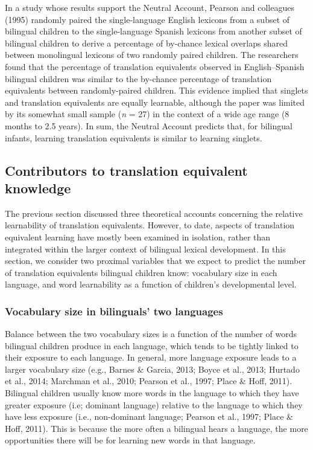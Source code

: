 \documentclass[
  english,
  ,man,floatsintext]{apa6}
\begin{document}
In a study whose results support the Neutral Account, Pearson and colleagues (1995) randomly paired the single-language English lexicons from a subset of bilingual children to the single-language Spanish lexicons from another subset of bilingual children to derive a percentage of by-chance lexical overlaps shared between monolingual lexicons of two randomly paired children. The researchers found that the percentage of translation equivalents observed in English--Spanish bilingual children was similar to the by-chance percentage of translation equivalents between randomly-paired children. This evidence implied that singlets and translation equivalents are equally learnable, although the paper was limited by its somewhat small sample (\emph{n} = 27) in the context of a wide age range (8 months to 2.5 years). In sum, the Neutral Account predicts that, for bilingual infants, learning translation equivalents is similar to learning singlets.

\hypertarget{contributors-to-translation-equivalent-knowledge}{%
\subsection{Contributors to translation equivalent knowledge}\label{contributors-to-translation-equivalent-knowledge}}

The previous section discussed three theoretical accounts concerning the relative learnability of translation equivalents. However, to date, aspects of translation equivalent learning have mostly been examined in isolation, rather than integrated within the larger context of bilingual lexical development. In this section, we consider two proximal variables that we expect to predict the number of translation equivalents bilingual children know: vocabulary size in each language, and word learnability as a function of children's developmental level.

\hypertarget{vocabulary-size-in-bilinguals-two-languages}{%
\subsubsection{Vocabulary size in bilinguals' two languages}\label{vocabulary-size-in-bilinguals-two-languages}}

Balance between the two vocabulary sizes is a function of the number of words bilingual children produce in each language, which tends to be tightly linked to their exposure to each language. In general, more language exposure leads to a larger vocabulary size (e.g., Barnes \& Garcia, 2013; Boyce et al., 2013; Hurtado et al., 2014; Marchman et al., 2010; Pearson et al., 1997; Place \& Hoff, 2011). Bilingual children usually know more words in the language to which they have greater exposure (i.e; dominant language) relative to the language to which they have less exposure (i.e., non-dominant language; Pearson et al., 1997; Place \& Hoff, 2011). This is because the more often a bilingual hears a language, the more opportunities there will be for learning new words in that language.
\end{document}
